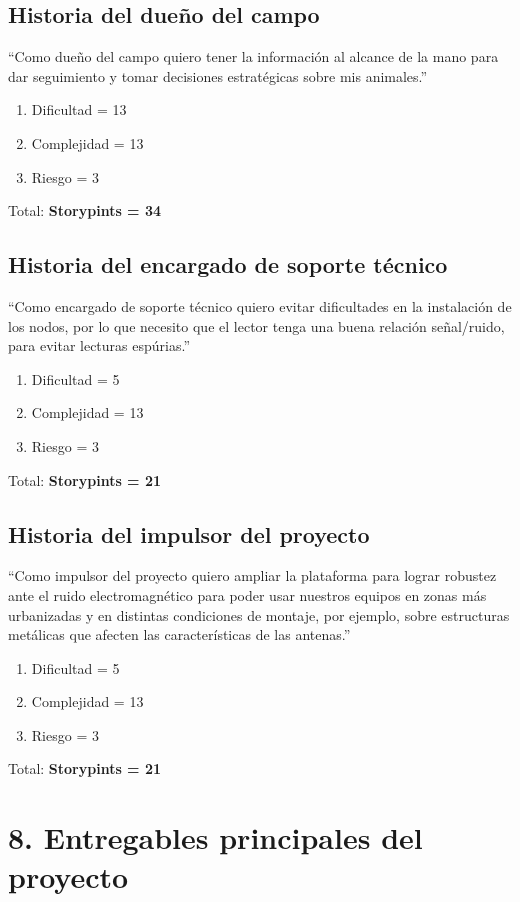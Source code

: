 \documentclass[
11pt, %
]{charter}
\begin{document}
\subsection{Historia del dueño del campo}
``Como dueño del campo quiero tener la información al alcance de la mano para dar seguimiento y tomar decisiones estratégicas sobre mis animales.''
\begin{enumerate}
      \item Dificultad = 13 
      \item Complejidad = 13
      \item Riesgo = 3
\end{enumerate}
 Total: \textbf{Storypints = 34 }

\subsection{Historia del encargado de soporte técnico} 
``Como encargado de soporte técnico quiero evitar dificultades en la instalación de los nodos, por lo que necesito que el lector tenga una buena relación señal/ruido, para evitar lecturas espúrias.''
\begin{enumerate}
      \item Dificultad = 5
      \item Complejidad = 13
      \item Riesgo = 3
\end{enumerate}
 Total: \textbf{Storypints = 21 }
 
\subsection{Historia del impulsor del proyecto} 
``Como impulsor del proyecto quiero ampliar la plataforma para lograr robustez ante el ruido electromagnético para poder usar nuestros equipos en zonas más urbanizadas y en distintas condiciones de montaje, por ejemplo, sobre estructuras metálicas que afecten las características de las antenas.''
\begin{enumerate}
      \item Dificultad = 5
      \item Complejidad = 13
      \item Riesgo = 3
\end{enumerate}
 Total: \textbf{Storypints = 21 }
 


\section{8. Entregables principales del proyecto}
\label{sec:entregables}
\end{document}
